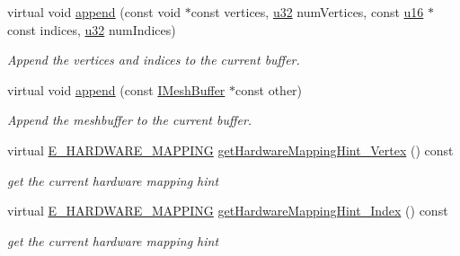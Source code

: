 \begin{DoxyCompactItemize}
virtual void \hyperlink{classirr_1_1scene_1_1IDynamicMeshBuffer_a0fb73ead4f2d2d86e9fef8768be1a1ff}{append} (const void $\ast$const vertices, \hyperlink{namespaceirr_a0416a53257075833e7002efd0a18e804}{u32} num\+Vertices, const \hyperlink{namespaceirr_ae9f8ec82692ad3b83c21f555bfa70bcc}{u16} $\ast$const indices, \hyperlink{namespaceirr_a0416a53257075833e7002efd0a18e804}{u32} num\+Indices)
\begin{DoxyCompactList}\small\item\em Append the vertices and indices to the current buffer. \end{DoxyCompactList}\item 
virtual void \hyperlink{classirr_1_1scene_1_1IDynamicMeshBuffer_aada30374517d2a52d6264b6359a1e35c}{append} (const \hyperlink{classirr_1_1scene_1_1IMeshBuffer}{I\+Mesh\+Buffer} $\ast$const other)
\begin{DoxyCompactList}\small\item\em Append the meshbuffer to the current buffer. \end{DoxyCompactList}\item 
\mbox{\label{classirr_1_1scene_1_1IDynamicMeshBuffer_a59b514ca8f413396314d2dc93e00f6d5}} 
virtual \hyperlink{namespaceirr_1_1scene_ac7d8ee8d77da75f2580bb9bb17231c27}{E\+\_\+\+H\+A\+R\+D\+W\+A\+R\+E\+\_\+\+M\+A\+P\+P\+I\+NG} \hyperlink{classirr_1_1scene_1_1IDynamicMeshBuffer_a59b514ca8f413396314d2dc93e00f6d5}{get\+Hardware\+Mapping\+Hint\+\_\+\+Vertex} () const
\begin{DoxyCompactList}\small\item\em get the current hardware mapping hint \end{DoxyCompactList}\item 
\mbox{\label{classirr_1_1scene_1_1IDynamicMeshBuffer_a4e08eea6ffaf32cc0d23c2b2008f4abb}} 
virtual \hyperlink{namespaceirr_1_1scene_ac7d8ee8d77da75f2580bb9bb17231c27}{E\+\_\+\+H\+A\+R\+D\+W\+A\+R\+E\+\_\+\+M\+A\+P\+P\+I\+NG} \hyperlink{classirr_1_1scene_1_1IDynamicMeshBuffer_a4e08eea6ffaf32cc0d23c2b2008f4abb}{get\+Hardware\+Mapping\+Hint\+\_\+\+Index} () const
\begin{DoxyCompactList}\small\item\em get the current hardware mapping hint \end{DoxyCompactList}\item 
\mbox{\label{classirr_1_1scene_1_1IDynamicMeshBuffer_a8286f22fc7967422e2ddb5c183473247}} 

\end{DoxyCompactItemize}
